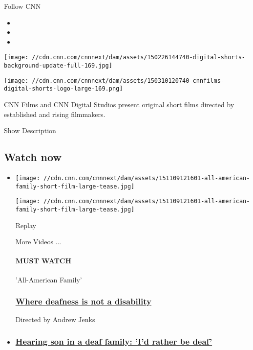 Follow CNN

\begin{itemize}
\item
\item
\item
\end{itemize}

\texttt{[image: //cdn.cnn.com/cnnnext/dam/assets/150226144740-digital-shorts-background-update-full-169.jpg]}

\texttt{[image: //cdn.cnn.com/cnnnext/dam/assets/150310120740-cnnfilms-digital-shorts-logo-large-169.png]}

CNN Films and CNN Digital Studios present original short films directed
by established and rising filmmakers.

Show Description

\hypertarget{watch-now-}{%
\subsection{Watch now~}\label{watch-now-}}

\begin{itemize}
\item
  \texttt{[image: //cdn.cnn.com/cnnnext/dam/assets/151109121601-all-american-family-short-film-large-tease.jpg]}

  \texttt{[image: //cdn.cnn.com/cnnnext/dam/assets/151109121601-all-american-family-short-film-large-tease.jpg]}\href{javascript:void(0);}{}

  Replay

  \href{/videos}{More Videos ...}

  \hypertarget{must-watch}{%
  \paragraph{MUST WATCH}\label{must-watch}}

  'All-American Family'

  \hypertarget{where-deafness-is-not-a-disability}{%
  \subsubsection{\texorpdfstring{\href{/videos/tv/2015/11/13/digital-shorts-all-american-family-deaf-football-team-andrew-jenks.cnn}{Where
  deafness is not a
  disability}}{Where deafness is not a disability}}\label{where-deafness-is-not-a-disability}}

  Directed by Andrew Jenks
\item
  \hypertarget{hearing-son-in-a-deaf-family-id-rather-be-deaf}{%
  \subsubsection{\texorpdfstring{\href{http://www.cnn.com/2015/11/23/living/deaf-culture-all-american-family-cnn-digital-short/index.html}{Hearing
  son in a deaf family: 'I'd rather be
  deaf'}}{Hearing son in a deaf family: 'I'd rather be deaf'}}\label{hearing-son-in-a-deaf-family-id-rather-be-deaf}}
\end{itemize}


